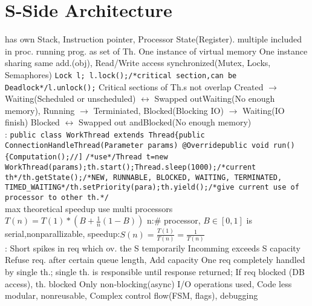 \section{S-Side Architecture}
has own Stack, 
Instruction pointer, 
Processor State(Register). 
multiple included in proc.
running prog. as set of Th.
One instance of virtual memory
One instance
\redtext{+}
sharing same add.(obj), 
Read/Write access synchronized(Mutex, Locks, Semaphores)
\lstinline{Lock l; l.lock();/*critical section,can be Deadlock*/l.unlock();}
Critical sections of Th.s not overlap
%
Created
$\rightarrow$
Waiting(Scheduled or unscheduled)
$\leftrightarrow$
Swapped outWaiting(No enough memory), Running
$\rightarrow$
Terminiated, Blocked(Blocking IO)
$\rightarrow$
Waiting(IO finish)
\textbar
Blocked
$\leftrightarrow$
Swapped out andBlocked(No enough memory)
\\
: 
\lstinline{public class WorkThread extends Thread{public ConnectionHandleThread(Parameter params) @Overridepublic void run(){Computation();//]}
\lstinline{/*use*/Thread t=new WorkThread(params);th.start();Thread.sleep(1000);/*current th*/th.getState();/*NEW, RUNNABLE, BLOCKED, WAITING, TERMINATED, TIMED_WAITING*/th.setPriority(para);th.yield();/*give current use of processor to other th.*/}
\\
max theoretical speedup use multi processors
$T(n)=T(1)*(B+\frac{1}{n}(1-B))$
n:\# processor,
$B\in[0,1]$ is serial,nonparallizable,
speedup:$S(n)=\frac{T(1)}{T(n)}=\frac{1}{T(n)}$
\\
:
Short spikes in req which ov. the S temporarily
Incomming exceeds S capacity
Refuse req. after certain queue length, Add capacity
One req completely handled by single th.;
single th. is responsible until response returned;
If req blocked (DB access), th. blocked
%
%
\btext{--:}
Only non‐blocking(async) I/O operations used,
Code less modular, 
nonreusable,
Complex control flow(FSM, flags), debugging
